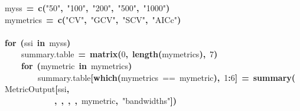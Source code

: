 \documentclass{article}
\makeatletter
\newcommand{\hlnumber}[1]{\textcolor[rgb]{0,0,0}{#1}}%
\newcommand{\hlfunctioncall}[1]{\textcolor[rgb]{0.501960784313725,0,0.329411764705882}{\textbf{#1}}}%
\newcommand{\hlstring}[1]{\textcolor[rgb]{0.6,0.6,1}{#1}}%
\newcommand{\hlkeyword}[1]{\textcolor[rgb]{0,0,0}{\textbf{#1}}}%
\newcommand{\hlassignement}[1]{\textcolor[rgb]{0,0,0}{\textbf{#1}}}%
\newcommand{\hlsymbol}[1]{\textcolor[rgb]{0,0,0}{#1}}%
\newcommand{\hlstd}[1]{\textcolor[rgb]{0,0,0}{#1}}%
\newenvironment{kframe}{%
 \def\FrameCommand##1{\hskip\@totalleftmargin \hskip-\fboxsep
 \colorbox{shadecolor}{##1}\hskip-\fboxsep
     \hskip-\linewidth \hskip-\@totalleftmargin \hskip\columnwidth}%
 \MakeFramed {\advance\hsize-\width
   \@totalleftmargin\z@ \linewidth\hsize
   \@setminipage}}%
 {\par\unskip\endMakeFramed}
\newenvironment{knitrout}{}{} %
\makeatother
\begin{document}
\begin{knitrout}
\color{fgcolor}\begin{kframe}
\begin{flushleft}
\ttfamily\noindent
\hlsymbol{myss}{\ }\hlassignement{=}{\ }\hlfunctioncall{c}\hlkeyword{(}\hlstring{"{}50"{}}\hlkeyword{,}{\ }\hlstring{"{}100"{}}\hlkeyword{,}{\ }\hlstring{"{}200"{}}\hlkeyword{,}{\ }\hlstring{"{}500"{}}\hlkeyword{,}{\ }\hlstring{"{}1000"{}}\hlkeyword{)}\hspace*{\fill}\\
\hlstd{}\hlsymbol{mymetrics}{\ }\hlassignement{=}{\ }\hlfunctioncall{c}\hlkeyword{(}\hlstring{"{}CV"{}}\hlkeyword{,}{\ }\hlstring{"{}GCV"{}}\hlkeyword{,}{\ }\hlstring{"{}SCV"{}}\hlkeyword{,}{\ }\hlstring{"{}AICc"{}}\hlkeyword{)}\hspace*{\fill}\\
\hlstd{}\hspace*{\fill}\\
\hlstd{}\hlkeyword{for}{\ }\hlkeyword{(}\hlsymbol{ssi}{\ }\hlkeyword{in}{\ }\hlsymbol{myss}\hlkeyword{)}{\ }\hlkeyword{\usebox{\hlnormalsizeboxopenbrace}}\hspace*{\fill}\\
\hlstd{}{\ }{\ }{\ }{\ }\hlsymbol{summary.table}{\ }\hlassignement{=}{\ }\hlfunctioncall{matrix}\hlkeyword{(}\hlnumber{0}\hlkeyword{,}{\ }\hlfunctioncall{length}\hlkeyword{(}\hlsymbol{mymetrics}\hlkeyword{)}\hlkeyword{,}{\ }\hlnumber{7}\hlkeyword{)}\hspace*{\fill}\\
\hlstd{}{\ }{\ }{\ }{\ }\hlkeyword{for}{\ }\hlkeyword{(}\hlsymbol{mymetric}{\ }\hlkeyword{in}{\ }\hlsymbol{mymetrics}\hlkeyword{)}{\ }\hlkeyword{\usebox{\hlnormalsizeboxopenbrace}}\hspace*{\fill}\\
\hlstd{}{\ }{\ }{\ }{\ }{\ }{\ }{\ }{\ }\hlsymbol{summary.table}\hlkeyword{[}\hlfunctioncall{which}\hlkeyword{(}\hlsymbol{mymetrics}{\ }=={\ }\hlsymbol{mymetric}\hlkeyword{)}\hlkeyword{,}{\ }\hlnumber{1}\hlkeyword{:}\hlnumber{6}\hlkeyword{]}{\ }\hlassignement{=}{\ }\hlfunctioncall{summary}\hlkeyword{(}\hlsymbol{MetricOutput}\hlkeyword{[}\hlsymbol{ssi}\hlkeyword{,}\hspace*{\fill}\\
\hlstd{}{\ }{\ }{\ }{\ }{\ }{\ }{\ }{\ }{\ }{\ }{\ }{\ }\hlkeyword{,}{\ }\hlkeyword{,}{\ }\hlkeyword{,}{\ }\hlkeyword{,}{\ }\hlsymbol{mymetric}\hlkeyword{,}{\ }\hlstring{"{}bandwidths"{}}\hlkeyword{]}\hlkeyword{)}\hspace*{\fill}\\

\end{flushleft}
\end{kframe}
\end{knitrout}
\end{document}

